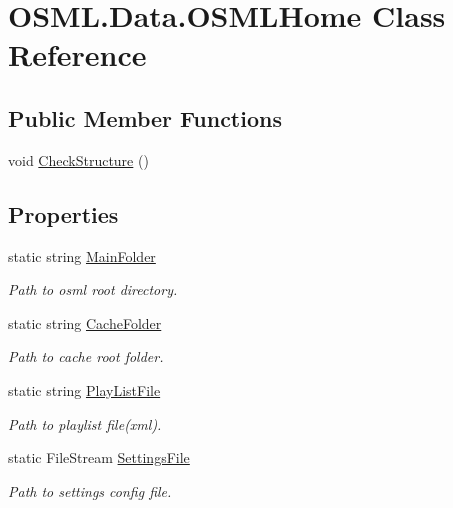 \hypertarget{classOSML_1_1Data_1_1OSMLHome}{}\section{O\+S\+M\+L.\+Data.\+O\+S\+M\+L\+Home Class Reference}
\label{classOSML_1_1Data_1_1OSMLHome}
\subsection*{Public Member Functions}
\begin{DoxyCompactItemize}
\item 
void \mbox{\hyperlink{classOSML_1_1Data_1_1OSMLHome_a097ce91f796027c23ca5f220157f56c9}{Check\+Structure}} ()
\end{DoxyCompactItemize}
\subsection*{Properties}
\begin{DoxyCompactItemize}
\item 
static string \mbox{\hyperlink{classOSML_1_1Data_1_1OSMLHome_a1ceb8489f75244fe9d94ecb5f6bbbeb6}{Main\+Folder}}
\begin{DoxyCompactList}\small\item\em Path to osml root directory. \end{DoxyCompactList}\item 
static string \mbox{\hyperlink{classOSML_1_1Data_1_1OSMLHome_a6edb591b8115f73bb984db19a75caafa}{Cache\+Folder}}
\begin{DoxyCompactList}\small\item\em Path to cache root folder. \end{DoxyCompactList}\item 
static string \mbox{\hyperlink{classOSML_1_1Data_1_1OSMLHome_aa1fc000031a2a076d2e7f938aaa1518f}{Play\+List\+File}}
\begin{DoxyCompactList}\small\item\em Path to playlist file(xml). \end{DoxyCompactList}\item 
static File\+Stream \mbox{\hyperlink{classOSML_1_1Data_1_1OSMLHome_a91903e55d6126f091a4bdc3be8972f5a}{Settings\+File}}
\begin{DoxyCompactList}\small\item\em Path to settings config file. \end{DoxyCompactList}\end{DoxyCompactItemize}


